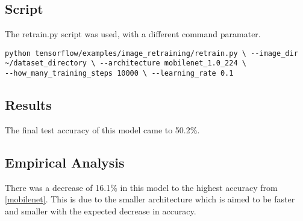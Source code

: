 \subsection*{Script}
The retrain.py script \textcite{retrainInception} was used, with a different
command paramater.

\begin{lstlisting}
python tensorflow/examples/image_retraining/retrain.py \ --image_dir
~/dataset_directory \ --architecture mobilenet_1.0_224 \
--how_many_training_steps 10000 \ --learning_rate 0.1
\end{lstlisting}

\subsection*{Results}
The final test accuracy of this model came to 50.2\%.

\subsection*{Empirical Analysis}
There was a decrease of 16.1\% in this model to the highest accuracy from
\ref{mobilenet}. This is due to the smaller architecture which is aimed to be faster
and smaller with the expected decrease in accuracy.
